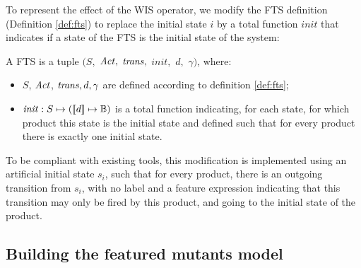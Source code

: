 To represent the effect of the WIS operator, we modify the FTS definition (Definition \ref{def:fts}) to replace the initial state $i$ by  a total function $init$ that indicates if a state of the FTS is the initial state of the system: 
%
\begin{definition}
\label{def:fts4fmm}
A \gls{FTS} is a tuple $(S,$ $\mathit{Act},$ $\mathit{trans},$ $\mathit{init},$ $d,$ $\gamma)$, where:
\begin{itemize}
\item $S$, $\mathit{Act}$, $\mathit{trans}, d, \gamma$ are defined according to definition \ref{def:fts}; 
\item $\mathit{init}:  S \mapsto ([\![ d]\!] \mapsto \mathbb{B})$ is a total function indicating, for each state, for which product this state is the initial state and defined such that for every product there is exactly one initial state.
\end{itemize}
\end{definition}
%
To be compliant with existing tools, this modification is implemented using an artificial initial state $s_i$, such that for every product, there is an outgoing transition from $s_i$, with no label and a feature expression indicating that this transition may only be fired by this product, and going to the initial state of the product.


\subsection{Building the featured mutants model} 

